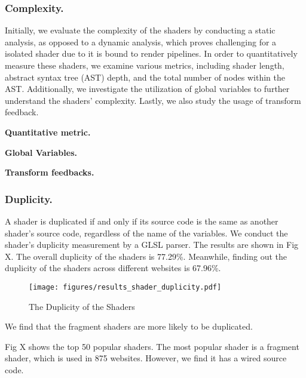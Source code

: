 

\subsubsection{Complexity.} Initially, we evaluate the complexity of the shaders by conducting a static analysis, as opposed to a dynamic analysis, which proves challenging for a isolated shader due to it is bound to render pipelines. In order to quantitatively measure these shaders, we examine various metrics, including shader length, abstract syntax tree (AST) depth, and the total number of nodes within the AST. Additionally, we investigate the utilization of global variables to further understand the shaders' complexity. Lastly, we also study the usage of transform feedback.

\textbf{Quantitative metric.}

\textbf{Global Variables.} 

\textbf{Transform feedbacks.}


\subsubsection{Duplicity.} A shader is duplicated if and only if its source code is the same as another shader's source code, regardless of the name of the variables. We conduct the shader's duplicity measurement by a GLSL parser. The results are shown in Fig X. The overall duplicity of the shaders is 77.29\%. Meanwhile, finding out the duplicity of the shaders across different websites is 67.96\%.


\begin{figure}[tp]
\centering
\texttt{[image: figures/results\_shader\_duplicity.pdf]}
\caption{The Duplicity of the Shaders}\label{fig_shader_dup}
\end{figure}

We find that the fragment shaders are more likely to be duplicated.

Fig X shows the top 50 popular shaders. The most popular shader is a fragment shader, which is used in 875 websites. However, we find it has a wired source code.

